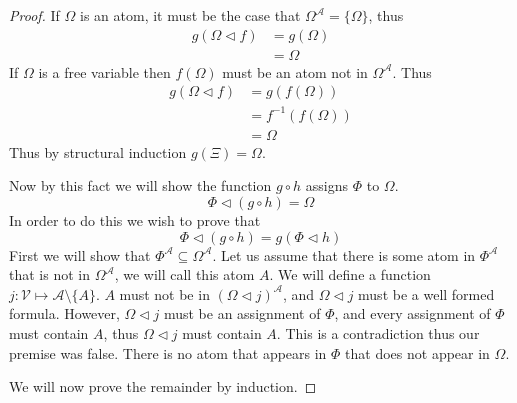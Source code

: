 \documentclass{article}
\begin{document}
\begin{proof}
If $\Omega$ is an atom, it must be the case that $\Omega^\mathcal{A} =\{\Omega\}$, thus
\begin{align*}
   g (\Omega \lhd f)
&= g (\Omega) \tag{Definition of Assignment} \\
&= \Omega     \tag{Definition of $g$}
\end{align*}
If $\Omega$ is a free variable then $f (\Omega)$ must be an atom not in $\Omega^\mathcal{A}$.
Thus
\begin{align*}
   g (\Omega \lhd f)
&= g (f (\Omega)) \tag{Definition of Assignment} \\
&= f^{-1} (f (\Omega)) \tag{Definition of $g$} \\
&= \Omega
\end{align*}
Thus by structural induction $g(\Xi) = \Omega$.

Now by this fact we will show the function $g \circ h$ assigns $\Phi$ to $\Omega$.
\begin{equation*}
\Phi \lhd (g \circ h) = \Omega
\end{equation*}
In order to do this we wish to prove that
\begin{equation*}
\Phi \lhd (g \circ h) = g (\Phi \lhd h)
\end{equation*}
First we will show that $\Phi^\mathcal{A} \subseteq \Omega^\mathcal{A}$.
Let us assume that there is some atom in $\Phi^\mathcal{A}$ that is not in $\Omega^\mathcal{A}$, we will call this atom $A$.
We will define a function $j : \mathcal{V} \mapsto \mathcal{A} \setminus \{A\}$.
$A$ must not be in $(\Omega \lhd j)^\mathcal{A}$, and $\Omega \lhd j$ must be a well formed formula.
However, $\Omega \lhd j$ must be an assignment of $\Phi$, and every assignment of $\Phi$ must contain $A$, thus $\Omega \lhd j$ must contain $A$.
This is a contradiction thus our premise was false.
There is no atom that appears in $\Phi$ that does not appear in $\Omega$.

We will now prove the remainder by induction.


\end{proof}
\end{document}
